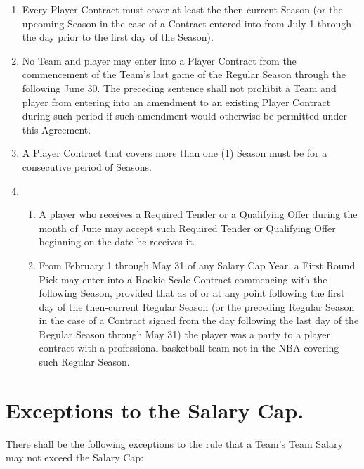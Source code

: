\documentclass[
]{book}
\providecommand{\tightlist}{%
  \setlength{\itemsep}{0pt}\setlength{\parskip}{0pt}}
\begin{document}
\begin{enumerate}
  \begin{enumerate}
  \def\labelenumii{(\arabic{enumii})}
  \item
    Every Player Contract must cover at least the then-current Season (or the upcoming Season in the case of a Contract entered into from July 1 through the day prior to the first day of the Season).
  \item
    No Team and player may enter into a Player Contract from the commencement of the Team's last game of the Regular Season through the following June 30. The preceding sentence shall not prohibit a Team and player from entering into an amendment to an existing Player Contract during such period if such amendment would otherwise be permitted under this Agreement.
  \item
    A Player Contract that covers more than one (1) Season must be for a consecutive period of Seasons.
  \item
    \begin{enumerate}
    \def\labelenumiii{(\roman{enumiii})}
    \tightlist
    \item
      A player who receives a Required Tender or a Qualifying Offer during the month of June may accept such Required Tender or Qualifying Offer beginning on the date he receives it.
    \item
      From February 1 through May 31 of any Salary Cap Year, a First Round Pick may enter into a Rookie Scale Contract commencing with the following Season, provided that as of or at any point following the first day of the then-current Regular Season (or the preceding Regular Season in the case of a Contract signed from the day following the last day of the Regular Season through May 31) the player was a party to a player contract with a professional basketball team not in the NBA covering such Regular Season.
    \end{enumerate}
  \end{enumerate}
\end{enumerate}

\hypertarget{exceptions-to-the-salary-cap.}{%
\section{Exceptions to the Salary Cap.}\label{exceptions-to-the-salary-cap.}}

There shall be the following exceptions to the rule that a Team's Team Salary may not exceed the Salary Cap:
\end{document}

